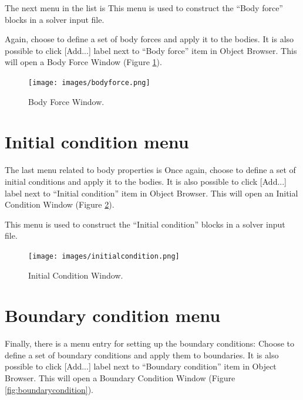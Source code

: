 The next menu in the list is
 This menu is used to construct the ``Body force'' blocks in a
solver input file.

\noindent Again, choose
\noindent to define a set of body forces and apply it to the bodies. It is also possible to click [Add...] label next to ``Body force'' item in Object Browser. This will open a Body Force Window (Figure \ref{fig:bodyforce}).

\begin{figure}[htb]
\begin{center}
 \texttt{[image: images/bodyforce.png]}
\caption{Body Force Window.}
\label{fig:bodyforce}
\end{center}
\end{figure}

\section{Initial condition menu}

The last menu related to body properties is
\noindent 
Once again, choose
\noindent to define a set of initial conditions and apply it to the bodies. It is also possible to click [Add...] label next to ``Initial condition'' item in Object Browser. This will open an Initial Condition Window (Figure \ref{fig:initialcondition}).

This menu is used to construct the ``Initial condition'' blocks in a
solver input file.

\begin{figure}[htb]
\begin{center}
 \texttt{[image: images/initialcondition.png]}
\caption{Initial Condition Window.}
\label{fig:initialcondition}
\end{center}
\end{figure}

\section{Boundary condition menu}

Finally, there is a menu entry for setting up the boundary conditions:
\noindent Choose
\noindent to define a set of boundary conditions and apply them to boundaries. It is also possible to click [Add...] label next to ``Boundary condition'' item in Object Browser. This will open a Boundary Condition Window (Figure \ref{fig:boundarycondition}). 

